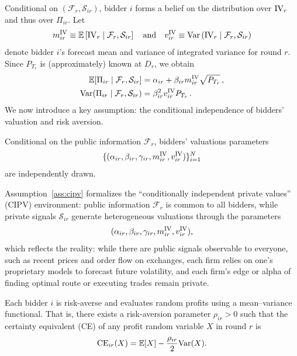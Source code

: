 Conditional on $(\mathcal F_r, \mathcal S_{ir})$, bidder $i$ forms a belief on the distribution over $\mathrm{IV}_r$ and thus over $\Pi_{ir}$. Let
\begin{equation}
m^{\mathrm{IV}}_{ir} \equiv \mathbb{E}\left[\mathrm{IV}_r \mid \mathcal F_r, \mathcal S_{ir} \right] \quad \text{and} \quad v^{\mathrm{IV}}_{ir} \equiv \mathrm{Var}\left(\mathrm{IV}_r \mid \mathcal F_r, \mathcal S_{ir} \right)
\end{equation}
denote bidder $i$'s forecast mean and variance of integrated variance for round $r$. Since $P_{T_r}$ is (approximately) known at $D_r$, we obtain
\begin{align}
  \mathbb{E}\!\left[\Pi_{ir} \mid \mathcal F_r, \mathcal S_{ir} \right]
    &= \alpha_{ir} + \beta_{ir} m^{\mathrm{IV}}_{ir} \sqrt{P_{T_r}} \, , \label{eq:profit-mean} \\
  \mathrm{Var}\!\left(\Pi_{ir} \mid \mathcal F_r, \mathcal S_{ir} \right)
    &= \beta_{ir}^2 v^{\mathrm{IV}}_{ir} P_{T_r} \, . \label{eq:profit-var}
\end{align}
We now introduce a key assumption: the conditional independence of bidders' valuation and risk aversion.

\begin{assump}[CIPV]\label{ass:cipv}
Conditional on the public information $\mathcal F_r$, bidders' valuations parameters \[\{(\alpha_{ir}, \beta_{ir}, \gamma_{ir}, m^{\mathrm{IV}}_{ir}, v^{\mathrm{IV}}_{ir})\}_{i=1}^N\] are independently drawn.
\end{assump}

\noindent Assumption~\ref{ass:cipv} formalizes the ``conditionally independent private values'' (CIPV) environment: public information $\mathcal F_r$ is common to all bidders, while private signals $\mathcal S_{ir}$ generate heterogeneous valuations through the parameters \[(\alpha_{ir}, \beta_{ir}, \gamma_{ir}, m^{\mathrm{IV}}_{ir}, v^{\mathrm{IV}}_{ir}),\] which reflects the reality: while there are public signals observable to everyone, such as recent prices and order flow on exchanges, each firm relies on one's proprietary models to forecast future volatility, and each firm's edge or alpha of finding optimal route or executing trades remain private.

\begin{assump}[Preferences]\label{ass:preferences}
Each bidder $i$ is risk-averse and evaluates random profits using a mean--variance functional. That is, there exists a risk-aversion parameter $\rho_{ir} > 0$ such that the certainty equivalent (CE) of any profit random variable $X$ in round $r$ is
\[
  \mathrm{CE}_{ir}(X)
  = \mathbb{E}[X] - \frac{\rho_{ir}}{2} \mathrm{Var}(X).
\]
\end{assump}

